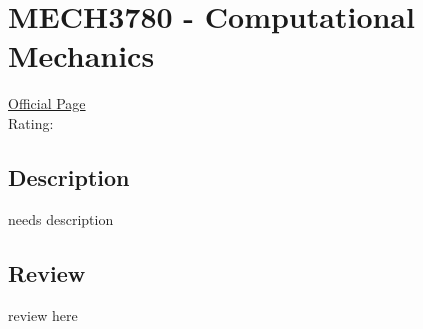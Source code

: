 \hypertarget{MECH3780}{\section{MECH3780 - Computational Mechanics}}

\large
\textcolor{turbo_purple}{\href{https://my.uq.edu.au/programs-courses/course.html?course_code=MECH3780}{Official Page}} \\
Rating: \cstar\cstar\cstar\cstar\ostar

\normalsize
\subsection*{Description}
needs description

\subsection*{Review}
review here
